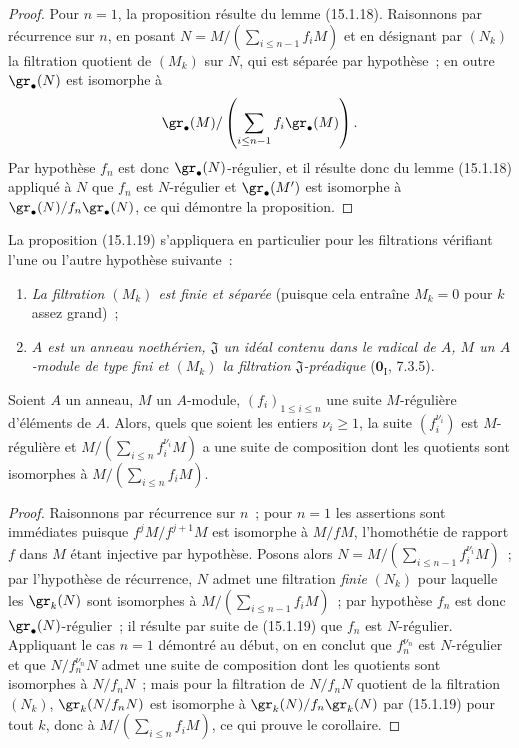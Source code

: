 \begin{proof}
Pour $n=1$, la proposition résulte du lemme (15.1.18). Raisonnons par
récurrence sur $n$, en posant
$N=M/(\sum_{i\leq n-1}f_iM)$
et en désignant par $(N_k)$ la filtration quotient de $(M_k)$ sur $N$, qui
est séparée par hypothèse~; en outre $\gr_\bullet(N)$ est isomorphe à
\[
  \gr_\bullet(M)/
  \left(\sum_{i\leq n-1}f_i\gr_\bullet(M)\right).
\]
Par hypothèse $f_n$ est donc $\gr_\bullet(N)$-régulier, et il résulte donc du
lemme (15.1.18) appliqué à $N$ que $f_n$ est $N$-régulier et
$\gr_\bullet(M')$ est isomorphe à
$\gr_\bullet(N)/f_n\gr_\bullet(N)$, ce qui démontre la proposition.
\end{proof}

La proposition (15.1.19) s'appliquera en particulier pour les filtrations
vérifiant l'une ou l'autre hypothèse suivante~:
\begin{enumerate}
  \item[$1^\circ$] \emph{La filtration $(M_k)$ est finie et séparée} (puisque cela
  entraîne $M_k=0$ pour $k$ assez grand)~;
  \item[$2^\circ$] \emph{$A$ est un anneau noethérien, $\mathfrak{J}$ un idéal
  contenu dans le radical de $A$, $M$ un $A$-module de type fini et $(M_k)$
  la filtration $\mathfrak{J}$-préadique} ($\mathbf{0}_{\mathrm I}$, 7.3.5).
\end{enumerate}

\begin{corollary}[15.1.20]
\label{0.15.1.20-fr}
Soient $A$ un anneau, $M$ un $A$-module, $(f_i)_{1\leq i\leq n}$ une suite
$M$-régulière d'éléments de $A$. Alors, quels que soient les entiers
$\nu_i\geq1$, la suite $(f_i^{\nu_i})$ est $M$-régulière et
$M/(\sum_{i\leq n}f_i^{\nu_i}M)$ a une suite de composition dont les
quotients sont isomorphes à $M/(\sum_{i\leq n}f_iM)$.
\end{corollary}

\begin{proof}
Raisonnons par récurrence sur $n$~; pour $n=1$ les assertions sont immédiates
puisque $f^jM/f^{j+1}M$ est isomorphe à $M/fM$, l'homothétie de rapport $f$
dans $M$ étant injective par hypothèse. Posons alors
$N=M/(\sum_{i\leq n-1}f_i^{\nu_i}M)$~;
par l'hypothèse de récurrence, $N$ admet une filtration \emph{finie} $(N_k)$ pour
laquelle les $\gr_k(N)$ sont isomorphes à
$M/(\sum_{i\leq n-1}f_iM)$~; par hypothèse $f_n$ est donc
$\gr_\bullet(N)$-régulier~; il résulte par suite de (15.1.19) que $f_n$ est
$N$-régulier. Appliquant le cas $n=1$ démontré au début, on en conclut que
$f_n^{\nu_n}$ est $N$-régulier et que $N/f_n^{\nu_n}N$ admet une suite de
composition dont les quotients sont isomorphes à $N/f_nN$~; mais pour la
filtration de $N/f_nN$ quotient de la filtration $(N_k)$,
$\gr_k(N/f_nN)$ est isomorphe à $\gr_k(N)/f_n\gr_k(N)$ par (15.1.19) pour
tout $k$, donc à $M/(\sum_{i\leq n}f_iM)$, ce qui prouve le corollaire.
\end{proof}

